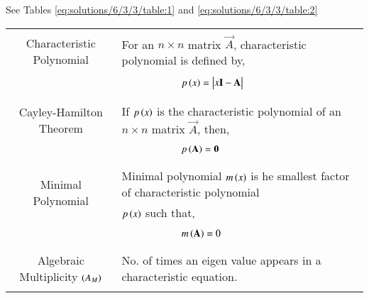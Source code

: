 See Tables    \ref{eq:solutions/6/3/3/table:1} and  \ref{eq:solutions/6/3/3/table:2}

\begin{table*}[ht!]
\centering
\begin{tabular}{|c|l|}
    \hline
	\multirow{3}{*}{Characteristic Polynomial} 
	& \\
	& For an $n\times n$ matrix $\vec{A}$, characteristic polynomial is defined by,\\
	&\\
	& $\qquad\qquad\qquad p\brak{x}=\mydet{x\Vec{I}-\Vec{A}}$\\
	&\\
	\hline
	\multirow{3}{*}{Cayley-Hamilton Theorem}
    &\\
    & If $p\left(x\right)$ is the characteristic polynomial of an $n\times n$ matrix $\vec{A}$, then,\\
    &\\
    &$\qquad \qquad \qquad p\left(\mathbf{A}\right)=\mathbf{0}$\\
    &\\
    \hline
	\multirow{3}{*}{Minimal Polynomial} 
	&\\
	& Minimal polynomial $m\left(x\right)$ is he smallest factor of characteristic polynomial\\
	& $p\left(x\right)$ such that,\\
	&\\
	& $\qquad \qquad \qquad m\left(\mathbf{A}\right)=0$\\
	&\\
    \hline
    \multirow{3}{*}{Algebraic Multiplicity $\left(A_M\right)$}
    &\\
    & No. of times an eigen value appears in a characteristic equation.\\
    &\\
    \hline
\end{tabular}
    \caption{Definitions}
\label{eq:solutions/6/3/3/table:1}
\end{table*}
\onecolumn
